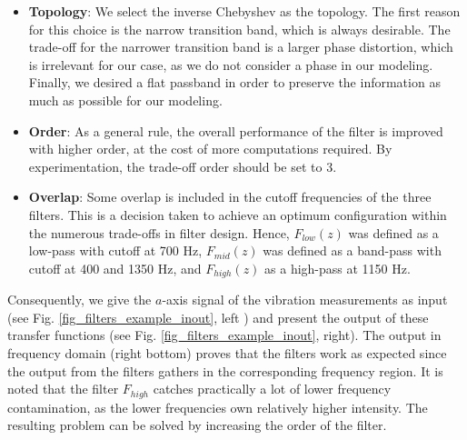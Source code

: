 \documentclass[conference]{IEEEtran}
\begin{document}
\begin{itemize}
	\item \textbf{Topology}: We select the inverse Chebyshev as the topology. The first reason for this choice is the narrow transition band, which is always desirable. The trade-off for the narrower transition band is a larger phase distortion, which is irrelevant for our case, as we do not consider a phase in our modeling. Finally, we desired a flat passband in order to preserve the information as much as possible for our modeling.
	\item \textbf{Order}: As a general rule, the overall performance of the filter is improved with higher order, at the cost of more computations required. By experimentation, the	trade-off order should be set to 3.
	\item \textbf{Overlap}: Some overlap is included in the cutoff frequencies of the three filters. This is a decision taken to achieve an optimum configuration within the numerous trade-offs in filter design. Hence, $F_{low}(z)$ was defined as a low-pass with cutoff at 700 Hz, $F_{mid}(z)$ was defined as a band-pass with cutoff at 400 and 1350 Hz, and $F_{high}(z)$ as a high-pass at 1150 Hz.
\end{itemize}

Consequently, we give the $a$-axis signal of the vibration measurements as input (see Fig. \ref{fig_filters_example_inout}, left ) and present the output of these transfer functions (see Fig. \ref{fig_filters_example_inout}, right). The output in frequency domain (right bottom) proves that the filters work as expected since the output from the filters gathers in the corresponding frequency region. It is noted that the filter $F_{high}$ catches practically a lot of lower frequency contamination, as the lower frequencies own relatively higher intensity. The resulting problem can be solved by increasing the order of the filter.  

\end{document}
